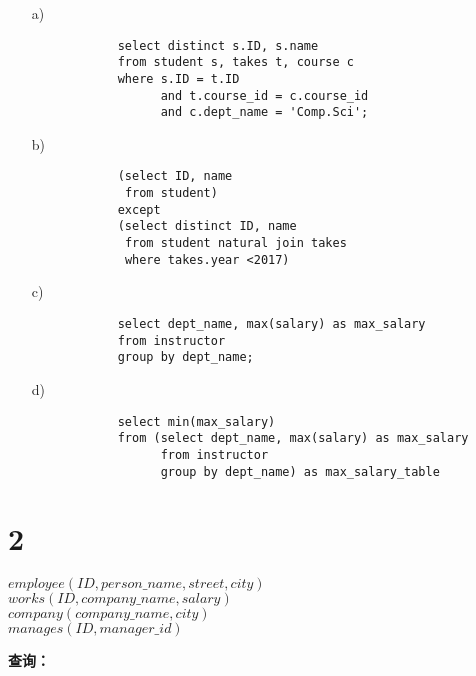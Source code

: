 \documentclass{article}
\begin{document}
	\begin{enumerate}[noitemsep, label={{\arabic*})}]
		\item[a)] 
		
		\begin{verbatim}
			select distinct s.ID, s.name
			from student s, takes t, course c
			where s.ID = t.ID
			      and t.course_id = c.course_id
			      and c.dept_name = 'Comp.Sci';
		\end{verbatim}
		
		\item[b)]
		
		\begin{verbatim}
			(select ID, name
			 from student)
			except
			(select distinct ID, name
			 from student natural join takes
			 where takes.year <2017)
		\end{verbatim}
		
		\item[c)]
		
		\begin{verbatim}
			select dept_name, max(salary) as max_salary
			from instructor
			group by dept_name;
		\end{verbatim}
		
		\item[d)] 
		
		\begin{verbatim}
			select min(max_salary)
			from (select dept_name, max(salary) as max_salary
			      from instructor
			      group by dept_name) as max_salary_table
		\end{verbatim}
	\end{enumerate}\textbf{}
	
	\section*{2}
	
	\noindent
	
	\begin{tcolorbox}[title = {雇员数据库}, colback = blue!25!white, colframe = blue!75!black]
		$employee(ID, person\_name, street, city)$ \\
		$works(ID, company\_name, salary)$ \\
		$company(company\_name, city)$ \\
		$manages(ID, manager\_id)$
	\end{tcolorbox}
	
	\noindent
	
	\textbf{查询：}
	
\end{document}
